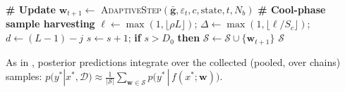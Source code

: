 \documentclass[11pt]{article}
\newcommand{\w}{\mathbf{w}}
\newcommand{\D}{\mathcal{D}}
\newcommand{\gbar}{\bar{\mathbf{g}}}
\begin{document}
\begin{algorithm}[t]
\begin{algorithmic}[1]
  \State \textbf{\# Update}
  \State $\w_{t+1} \gets$ \textsc{AdaptiveStep}$(\gbar, \varepsilon_t, c,
    \text{state}, t, N_b)$ 
  \State \textbf{\# Cool-phase sample harvesting}
    \State $\ell \gets \max(1, \lfloor\rho L\rfloor)$;\quad
      $\Delta \gets \max(1, \lfloor\ell / S_c\rfloor)$;\quad
      $d \gets (L - 1) - j$
      \State $s \gets s + 1$;\qquad
        \textbf{if} $s > D_0$ \textbf{then}
        $\mathcal{S} \gets \mathcal{S} \cup \{\w_{t+1}\}$
    \EndIf
  \EndIf
\EndFor
\State \Return $\mathcal{S}$
\end{algorithmic}
\end{algorithm}

As in \cite{wu2025}, posterior predictions integrate over the collected
(pooled, over chains) samples:
$p(y^{*}|x^{*},\D) \approx \tfrac{1}{|\mathcal{S}|}
\sum_{\w\in\mathcal{S}} p\bigl(y^{*}\,|\,f(x^{*};\w)\bigr)$.
\end{document}
